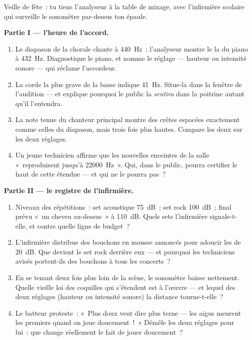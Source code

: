 \begin{problem}\label{pb:g8:sound-pitch-loudness:1}
Veille de fête~: tu tiens l'analyseur à la table de mixage, avec
l'infirmière scolaire qui surveille le sonomètre par-dessus ton
épaule.

\medskip\noindent\textbf{Partie I --- l'heure de l'accord.}
\begin{enumerate}
  \item Le diapason de la chorale chante à \qty{440}{Hz}~;
        l'analyseur montre le la du piano à \qty{432}{Hz}.
        Diagnostique le piano, et nomme le réglage --- hauteur ou
        intensité sonore --- qui réclame l'accordeur.
  \item La corde la plus grave de la basse indique \qty{41}{Hz}.
        Situe-la dans la fenêtre de l'audition --- et explique
        pourquoi le public la \emph{sentira} dans la poitrine
        autant qu'il l'entendra.
  \item La note tenue du chanteur principal montre des crêtes
        espacées exactement comme celles du diapason, mais trois
        fois plus hautes. Compare les deux  sur les deux
        réglages.
  \item Un jeune technicien affirme que les nouvelles enceintes de
        la salle «~reproduisent jusqu'à \qty{22000}{Hz}~». Qui,
        dans le public, pourra certifier le haut de cette étendue
        --- et qui ne le pourra pas~?
\end{enumerate}

\medskip\noindent\textbf{Partie II --- le registre de l'infirmière.}
\begin{enumerate}[resume]
  \item Niveaux des répétitions~: set acoustique \qty{75}{dB}~; set
        rock \qty{100}{dB}~; final prévu «~un cheveu au-dessus~» à
        \qty{110}{dB}. Quels sets l'infirmière signale-t-elle, et
        contre quelle ligne de budget~?
  \item L'infirmière distribue des bouchons en mousse annoncés pour
        adoucir les  de \qty{20}{dB}. Que devient le set rock
        derrière eux --- et pourquoi les techniciens avisés
        portent-ils des bouchons à tous les concerts~?
  \item En se tenant deux fois plus loin de la scène, le sonomètre
        baisse nettement. Quelle vieille loi des coquilles qui
        s'étendent est à l'œuvre --- et lequel des deux réglages
        (hauteur ou intensité sonore) la distance tourne-t-elle~?
  \item Le batteur proteste~: «~Plus doux veut dire plus terne ---
        les aigus meurent les premiers quand on joue doucement~!~»
        Démêle les deux réglages pour lui~: que change réellement
        le fait de jouer doucement~?
\end{enumerate}


\end{problem}
